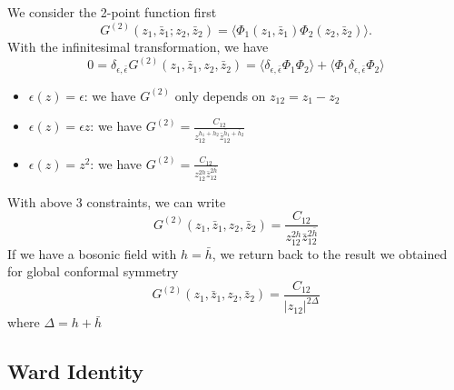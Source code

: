 \documentclass[a4paper,11pt]{article}
\begin{document}
We consider the 2-point function first
\begin{equation}
    G^{(2)}(z_1,\bar{z}_1;z_2,\bar{z}_2)=\langle\Phi_1(z_1,\bar{z}_1)\Phi_2(z_2,\bar{z}_2)\rangle.
\end{equation}
With the infinitesimal transformation, we have
\begin{equation}
    0=\delta_{\epsilon,\bar{\epsilon}}G^{(2)}
    (z_1,\bar{z}_1,z_2,\bar{z}_2)=\langle\delta_{\epsilon,\bar{\epsilon}}\Phi_1\Phi_2\rangle+\langle\Phi_1\delta_{\epsilon,\bar{\epsilon}}\Phi_2\rangle
\end{equation}
\begin{itemize}
    \item $\epsilon(z)=\epsilon$: we have $G^{(2)}$ only depends on $z_{12}=z_1-z_2$
    \item $\epsilon(z)=\epsilon z$: we have $G^{(2)}=\frac{C_{12}}{z_{12}^{h_1+h_2}\bar{z}_{12}^{\bar{h}_1+\bar{h}_2}}$
    \item $\epsilon(z)=z^2$: we have $G^{(2)}=\frac{C_{12}}{z_{12}^{2h}\bar{z}_{12}^{2\bar{h}}}$
\end{itemize}
With above 3 constraints, we can write
\begin{equation}
    G^{(2)}(z_1,\bar{z}_1,z_2,\bar{z}_2)=\frac{C_{12}}{z_{12}^{2h}\bar{z}_{12}^{2\bar{h}}}
\end{equation}
If we have a bosonic field with $h=\bar{h}$, we return back to the result we obtained for global conformal symmetry
\begin{equation}
    G^{(2)}(z_1,\bar{z}_1,z_2,\bar{z}_2)=\frac{C_{12}}{\left|z_{12}\right|^{2\Delta}}
\end{equation}
where $\Delta=h+\bar{h}$

\newpage
\subsection{Ward Identity}
\end{document}
